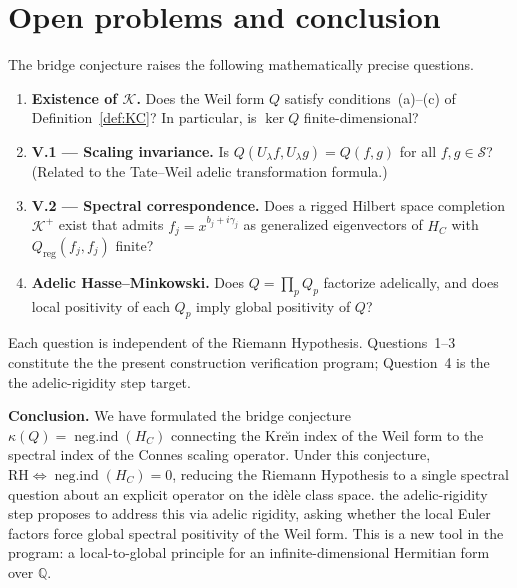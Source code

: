 \documentclass[11pt]{amsart}
\newcommand{\kap}{\kappa}
\newcommand{\negind}{\operatorname{neg.ind}}
\newcommand{\Kcal}{\mathcal{K}}
\newcommand{\Scal}{\mathcal{S}}
\begin{document}
\section{Open problems and conclusion}
\label{sec:conclusion}

The bridge conjecture raises the following mathematically precise questions.

\medskip
\begin{enumerate}
\setlength\itemsep{4pt}

\item \textbf{Existence of $\Kcal$.}  Does the Weil form $Q$ satisfy conditions~(a)--(c)
  of Definition~\ref{def:KC}?  In particular, is $\ker Q$ finite-dimensional?

\item \textbf{V.1 — Scaling invariance.}  Is $Q(U_\lambda f, U_\lambda g) = Q(f,g)$ for
  all $f, g \in \Scal$?  (Related to the Tate--Weil adelic transformation formula.)

\item \textbf{V.2 — Spectral correspondence.}  Does a rigged Hilbert space completion
  $\Kcal^+$ exist that admits $f_j = x^{b_j+i\gamma_j}$ as generalized eigenvectors
  of $H_C$ with $Q_\mathrm{reg}(f_j,f_j)$ finite?

\item \textbf{Adelic Hasse--Minkowski.}  Does $Q = \prod_p Q_p$ factorize adelically, and
  does local positivity of each $Q_p$ imply global positivity of $Q$?

\end{enumerate}

\medskip
Each question is independent of the Riemann Hypothesis.  Questions~1--3 constitute the
the present construction verification program; Question~4 is the the adelic-rigidity step target.

\medskip
\textbf{Conclusion.}  We have formulated the bridge conjecture
$\kap(Q) = \negind(H_C)$ connecting the Kre\u{\i}n index of the Weil form to the
spectral index of the Connes scaling operator.  Under this conjecture,
$\mathrm{RH} \iff \negind(H_C) = 0$, reducing the Riemann Hypothesis to a single
spectral question about an explicit operator on the id\`ele class space.
the adelic-rigidity step proposes to address this via adelic rigidity, asking whether the local Euler
factors force global spectral positivity of the Weil form.  This is a new tool in the
program: a local-to-global principle for an infinite-dimensional Hermitian form over
$\mathbb{Q}$.
\end{document}
